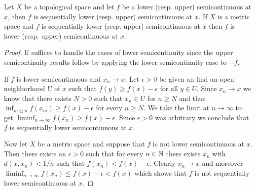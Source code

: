\begin{prop}Let $X$ be a topological space and let $f$ be a lower
  (resp. upper) semicontinuous at $x$, then $f$ is sequentially
  lower (resp. upper) semicontinuous at $x$.  If $X$ is a metric space and
  $f$ is sequentially lower (resp. upper) semicontinuous at $x$ then $f$ is
  lower (resp. upper) semicontinuous at $x$.
\end{prop}
\begin{proof}If suffices to handle the cases of lower semicontinuity
  since the upper semicontinuity results follow by applying the lower
  semicontinuity case to $-f$.

If $f$ is lower semicontinuous and $x_n \to x$.  Let $\epsilon > 0$ be
given an find an open neighborhood $U$ of $x$ such that $f(y) \geq
f(x) - \epsilon$ for all $y \in U$.  Since $x_n \to x$ we know that
there exists $N > 0$  such that $x_n \in U$ for $n \geq N$ and thus
$\inf_{m \geq n} f(x_m) \geq f(x) - \epsilon$ for every $n \geq N$.
We take the limit at $n \to \infty$ to get $\liminf_{n \to \infty}
f(x_n) \geq f(x) - \epsilon$.  Since $\epsilon > 0$ was arbitrary we
conclude that $f$ is sequentially lower semicontinuous at $x$.

Now let $X$ be a metric space and suppose that $f$ is not
lower semicontinuous at $x$.  Then there exists an $\epsilon > 0$ such
that for every $n \in \mathbb{N}$ there exists $x_n$ with $d(x,x_n) <
1/n$ such that $f(x_n) < f(x) - \epsilon$.  Clearly $x_n \to x$ and
moreover $\liminf_{n \to \infty} f(x_n) \leq f(x) - \epsilon < f(x)$
which shows that $f$ is not sequentially lower semicontinuous at $x$.
\end{proof}

